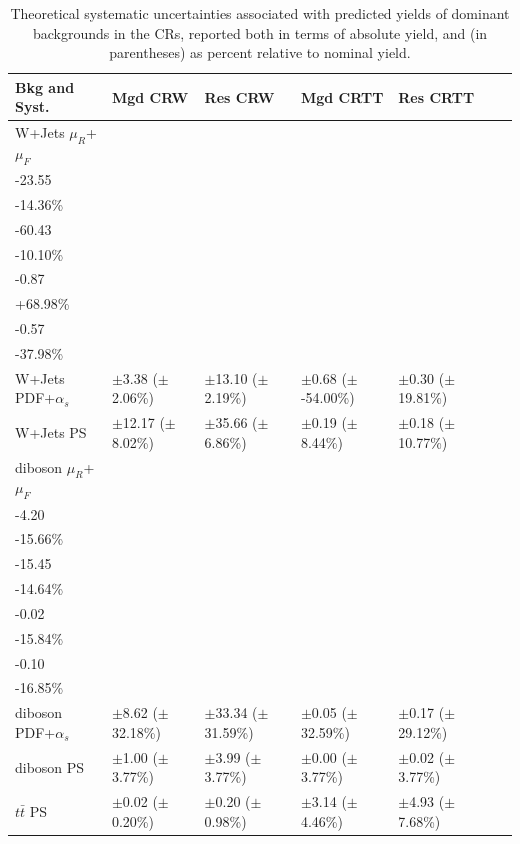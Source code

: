 \begin{table}[ht]
\footnotesize{
\caption{\label{tab:systs_bkg_CR} Theoretical systematic uncertainties associated with predicted yields of dominant backgrounds in the CRs, reported both in terms of absolute yield, and (in parentheses) as percent relative to nominal yield.}
\begin{tabular}{l l l l l l l }
\toprule
\textbf{Bkg and Syst.} & \textbf{Mgd CRW} & \textbf{Res CRW} & \textbf{Mgd CRTT} & \textbf{Res CRTT}\tabularnewline
\midrule
\midrule
W+Jets \(\mu_R\)+\(\mu_F\)  & \(\substack{+35.90\\-23.55}\) \big(\(\substack{+21.89\%\\-14.36\%}\)\big) & \(\substack{+42.02\\-60.43}\) \big(\(\substack{+7.03\%\\-10.10\%}\)\big) & \(\substack{+3.50\\-0.87}\) \big(\(\substack{-278.89\%\\+68.98\%}\)\big) & \(\substack{+4.83\\-0.57}\) \big(\(\substack{+319.96\%\\-37.98\%}\)\big) \tabularnewline
\midrule
W+Jets PDF+\(\alpha_s\) & \(\pm\)3.38 (\(\pm\)2.06\%) &\(\pm\)13.10 (\(\pm\)2.19\%) &\(\pm\)0.68 (\(\pm\)-54.00\%) &\(\pm\)0.30 (\(\pm\)19.81\%) \tabularnewline
\midrule
W+Jets PS & \(\pm\)12.17 (\(\pm\)8.02\%) &\(\pm\)35.66 (\(\pm\)6.86\%) &\(\pm\)0.19 (\(\pm\)8.44\%) &\(\pm\)0.18 (\(\pm\)10.77\%) \tabularnewline
\midrule
diboson \(\mu_R\)+\(\mu_F\) & \(\substack{+1.09\\-4.20}\) \big(\(\substack{+4.06\%\\-15.66\%}\)\big) & \(\substack{+18.37\\-15.45}\) \big(\(\substack{+17.40\%\\-14.64\%}\)\big) & \(\substack{+0.03\\-0.02}\) \big(\(\substack{+20.96\%\\-15.84\%}\)\big) & \(\substack{+0.13\\-0.10}\) \big(\(\substack{+22.80\%\\-16.85\%}\)\big) \tabularnewline
\midrule
diboson PDF+\(\alpha_s\) & \(\pm\)8.62 (\(\pm\)32.18\%) &\(\pm\)33.34 (\(\pm\)31.59\%) &\(\pm\)0.05 (\(\pm\)32.59\%) &\(\pm\)0.17 (\(\pm\)29.12\%) \tabularnewline
\midrule
diboson PS & \(\pm\)1.00 (\(\pm\)3.77\%) &\(\pm\)3.99 (\(\pm\)3.77\%) &\(\pm\)0.00 (\(\pm\)3.77\%) &\(\pm\)0.02 (\(\pm\)3.77\%) \tabularnewline
\midrule
\(t\bar{t}\) PS & \(\pm\)0.02 (\(\pm\)0.20\%) &\(\pm\)0.20 (\(\pm\)0.98\%) &\(\pm\)3.14 (\(\pm\)4.46\%) &\(\pm\)4.93 (\(\pm\)7.68\%) \tabularnewline

\end{tabular}}
\end{table}
